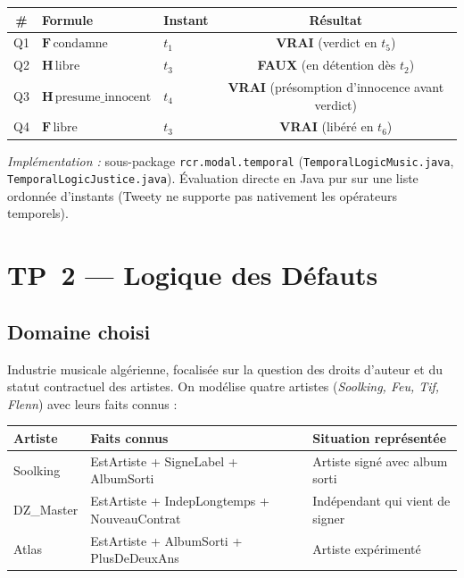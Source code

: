\documentclass[11pt, a4paper]{article}
\newcommand{\code}[1]{\texttt{#1}}
\begin{document}
\begin{center}\small
\begin{tabular}{cllc}
\toprule
\textbf{\#} & \textbf{Formule} & \textbf{Instant} & \textbf{Résultat} \\
\midrule
Q1 & $\mathbf{F}\,\text{condamne}$          & $t_1$ & \textbf{VRAI} (verdict en $t_5$) \\
Q2 & $\mathbf{H}\,\text{libre}$             & $t_3$ & \textbf{FAUX} (en détention dès $t_2$) \\
Q3 & $\mathbf{H}\,\text{presume\_innocent}$ & $t_4$ & \textbf{VRAI} (présomption d'innocence avant verdict) \\
Q4 & $\mathbf{F}\,\text{libre}$             & $t_3$ & \textbf{VRAI} (libéré en $t_6$) \\
\bottomrule
\end{tabular}
\end{center}

\noindent \emph{Implémentation :} sous-package \code{rcr.modal.temporal}
(\code{TemporalLogicMusic.java}, \code{TemporalLogicJustice.java}).
Évaluation directe en Java pur sur une liste ordonnée d'instants
(Tweety ne supporte pas nativement les opérateurs temporels).

\newpage
\section{TP~2 --- Logique des Défauts}

\subsection*{Domaine choisi}

Industrie musicale algérienne, focalisée sur la question des droits d'auteur
et du statut contractuel des artistes. On modélise quatre artistes
(\emph{Soolking, Feu, Tif, Flenn}) avec leurs faits connus :

\begin{center}\small
\begin{tabular}{lll}
\toprule
\textbf{Artiste} & \textbf{Faits connus} & \textbf{Situation représentée} \\
\midrule
Soolking  & EstArtiste + SigneLabel + AlbumSorti       & Artiste signé avec album sorti \\
DZ\_Master & EstArtiste + IndepLongtemps + NouveauContrat & Indépendant qui vient de signer \\
Atlas     & EstArtiste + AlbumSorti + PlusDeDeuxAns    & Artiste expérimenté \\
\bottomrule
\end{tabular}
\end{center}
\end{document}
